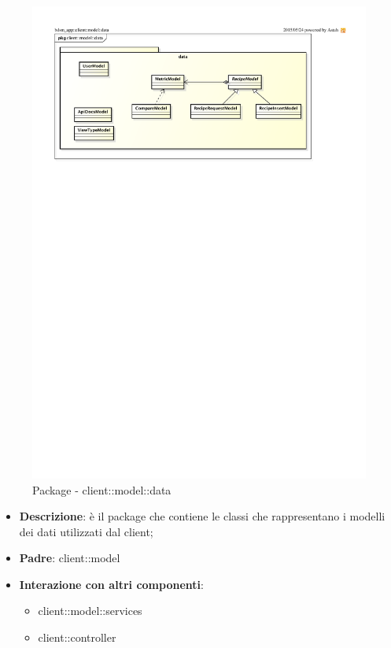 \begin{figure}[htbp]
	\centering
	\centerline{\includegraphics[scale=0.95]{./images/client/client_model_data.pdf}}
	\caption{Package - client::model::data}
\end{figure}

\begin{itemize}
	\item \textbf{Descrizione}: è il package che contiene le classi che rappresentano i modelli dei dati utilizzati dal client;
	\item \textbf{Padre}: client::model
	\item \textbf{Interazione con altri componenti}:
		\begin{itemize}
			\item client::model::services
			\item client::controller
		\end{itemize}
\end{itemize}

